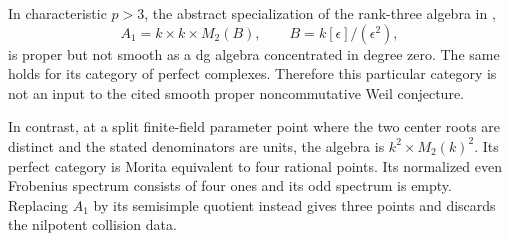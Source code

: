 \begin{finding}\label{f:ncweil}
In characteristic $p>3$, the abstract specialization of the
rank-three algebra in ,
\[
 A_1=k\times k\times M_2(B),\qquad B=k[\epsilon]/(\epsilon^2),
\]
is proper but not smooth as a dg algebra concentrated in degree zero.
The same holds for its category of perfect complexes. Therefore this
particular category is not an input to the cited smooth proper
noncommutative Weil conjecture.

In contrast, at a split finite-field parameter point where the two
center roots are distinct and the stated denominators are units,
the algebra is $k^2\times M_2(k)^2$. Its perfect category is Morita
equivalent to four rational points. Its normalized even Frobenius
spectrum consists of four ones and its odd spectrum is empty.
Replacing $A_1$ by its semisimple quotient instead gives three
points and discards the nilpotent collision data.
\end{finding}
